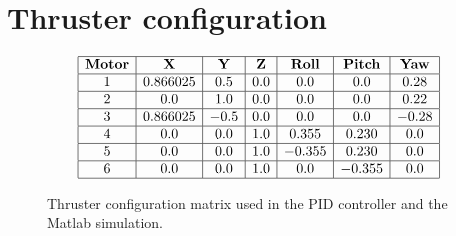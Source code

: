 \section{Thruster configuration}


\[
\begin{array}{|c|c|c|c|c|c|c|}
\hline
\textbf{Motor} &\textbf{X} & \textbf{Y} & \textbf{Z} & \textbf{Roll} & \textbf{Pitch} & \textbf{Yaw}\\
\hline
1 & 0.866025 & 0.5 & 0.0 & 0.0 & 0.0 & 0.28\\ 
\hline
2 & 0.0 & 1.0 & 0.0 & 0.0 & 0.0 & 0.22\\ 
\hline
3 & 0.866025 & -0.5 & 0.0 & 0.0 & 0.0 & -0.28\\ 
\hline
4 & 0.0 & 0.0 & 1.0 & 0.355 & 0.230 & 0.0\\ 
\hline
5 & 0.0 & 0.0 & 1.0 & -0.355 & 0.230 & 0.0\\ 
\hline
6 & 0.0 & 0.0 & 1.0 & 0.0 & -0.355 & 0.0\\
\hline
\end{array}
\]
\begin{figure}[!h]
\caption{Thruster configuration matrix used in the PID controller and the Matlab simulation.}
\end{figure}
